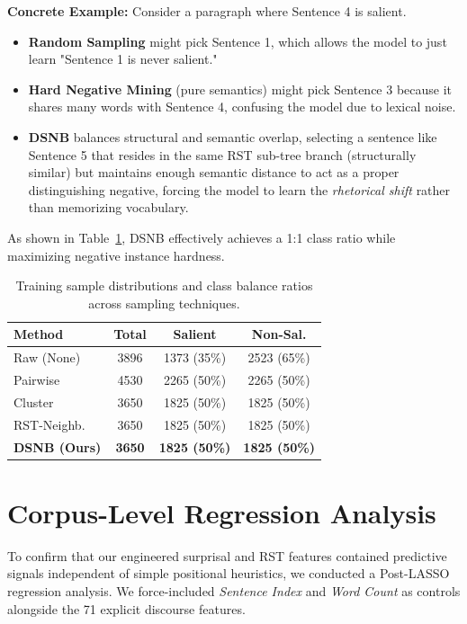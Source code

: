 \documentclass[11pt,a4paper,twocolumn]{article}
\begin{document}
\textbf{Concrete Example:} Consider a paragraph where Sentence 4 is salient. 
\begin{itemize}
    \item \textbf{Random Sampling} might pick Sentence 1, which allows the model to just learn "Sentence 1 is never salient."
    \item \textbf{Hard Negative Mining} (pure semantics) might pick Sentence 3 because it shares many words with Sentence 4, confusing the model due to lexical noise.
    \item \textbf{DSNB} balances structural and semantic overlap, selecting a sentence like Sentence 5 that resides in the same RST sub-tree branch (structurally similar) but maintains enough semantic distance to act as a proper distinguishing negative, forcing the model to learn the \textit{rhetorical shift} rather than memorizing vocabulary.
\end{itemize}

As shown in Table~\ref{tab:balancing}, DSNB effectively achieves a 1:1 class ratio while maximizing negative instance hardness.

\begin{table}[htbp]
\centering
\small
\begin{tabular}{lccc}
\toprule
\textbf{Method} & \textbf{Total} & \textbf{Salient} & \textbf{Non-Sal.} \\
\midrule
Raw (None) & 3896 & 1373 (35\%) & 2523 (65\%) \\
Pairwise & 4530 & 2265 (50\%) & 2265 (50\%) \\
Cluster & 3650 & 1825 (50\%) & 1825 (50\%) \\
RST-Neighb. & 3650 & 1825 (50\%) & 1825 (50\%) \\
\textbf{DSNB (Ours)} & \textbf{3650} & \textbf{1825 (50\%)} & \textbf{1825 (50\%)} \\
\bottomrule
\end{tabular}
\caption{Training sample distributions and class balance ratios across sampling techniques.}
\label{tab:balancing}
\end{table}

\section{Corpus-Level Regression Analysis}

To confirm that our engineered surprisal and RST features contained predictive signals independent of simple positional heuristics, we conducted a Post-LASSO regression analysis. We force-included \textit{Sentence Index} and \textit{Word Count} as controls alongside the 71 explicit discourse features.
\end{document}
